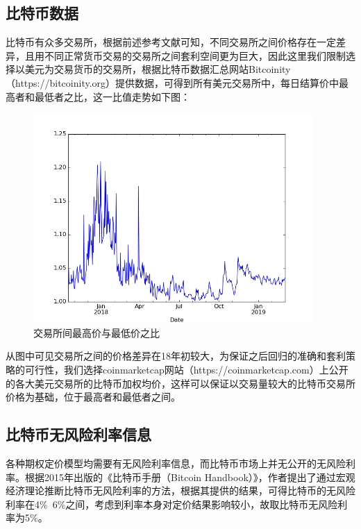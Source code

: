\subsection{比特币数据}
\par{
    比特币有众多交易所，根据前述参考文献可知，不同交易所之间价格存在一定差异，且用不同正常货币交易的交易所之间套利空间更为巨大\cite{Makarov-2018}，因此这里我们限制选择以美元为交易货币的交易所，根据比特币数据汇总网站Bitcoinity（https://bitcoinity.org）提供数据，可得到所有美元交易所中，每日结算价中最高者和最低者之比，这一比值走势如下图：
    \begin{figure}[H]
        \begin{small}
            \begin{center}
                \includegraphics[width=0.95\textwidth]{figures/maxmin_ratio_plot.png}
            \end{center}
            \caption{交易所间最高价与最低价之比}
            \label{maxmin_ratio}
        \end{small}
    \end{figure}
    }
    \par{从图中可见交易所之间的价格差异在18年初较大，为保证之后回归的准确和套利策略的可行性，我们选择coinmarketcap网站（https://coinmarketcap.com）上公开的各大美元交易所的比特币加权均价，这样可以保证以交易量较大的比特币交易所价格为基础，位于最高者和最低者之间。
    }
\subsection{比特币无风险利率信息}
    \par{各种期权定价模型均需要有无风险利率信息，而比特币市场上并无公开的无风险利率。根据2015年出版的《比特币手册（Bitcoin Handbook）》\cite{WESNER2015223}，作者提出了通过宏观经济理论推断比特币无风险利率的方法，根据其提供的结果，可得比特币的无风险利率在4$\%$~6$\%$之间，考虑到利率本身对定价结果影响较小，故取比特币无风险利率为5$\%$。
    }

